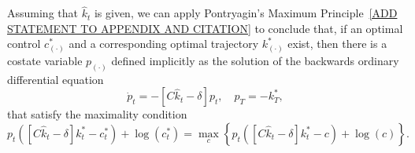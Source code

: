Assuming that ${\hat k_t}$ is given, we can apply Pontryagin's Maximum Principle~\ref{ADD STATEMENT TO APPENDIX AND CITATION}
to conclude that, if an optimal control $c^*_{(\cdot)}$ and a corresponding optimal trajectory $k^*_{(\cdot)}$ exist,
then there is a costate variable $p_{(\cdot)}$ defined implicitly as the solution of the backwards ordinary differential equation
\begin{equation}\label{economic_example:costate_ode}
    \dot p_t = -  \left[C{\hat k_t} - \delta \right] p_t, \quad p_T =  - k^*_T,
\end{equation}
that satisfy the maximality condition
\begin{equation}\label{economic_example:maximality_condition}
    p_t\left( \left[C {\hat k_t} - \delta \right]k^*_t - c^*_t \right) + \log(c^*_t) = 
    \max_c \left\{ p_t\left( \left[C {\hat k_t} - \delta \right]k^*_t - c \right) + \log(c) \right\}.
\end{equation}

